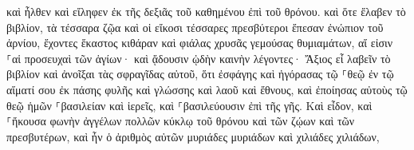 \documentclass{openreader}
\begin{document}
καὶ ἦλθεν καὶ εἴληφεν ἐκ τῆς δεξιᾶς τοῦ καθημένου ἐπὶ τοῦ θρόνου. 
καὶ ὅτε ἔλαβεν τὸ βιβλίον, τὰ τέσσαρα ζῷα καὶ οἱ εἴκοσι τέσσαρες πρεσβύτεροι ἔπεσαν ἐνώπιον τοῦ ἀρνίου, ἔχοντες ἕκαστος κιθάραν καὶ φιάλας χρυσᾶς γεμούσας θυμιαμάτων, αἵ εἰσιν ⸀αἱ προσευχαὶ τῶν ἁγίων· 
καὶ ᾄδουσιν ᾠδὴν καινὴν λέγοντες· Ἄξιος εἶ λαβεῖν τὸ βιβλίον καὶ ἀνοῖξαι τὰς σφραγῖδας αὐτοῦ, ὅτι ἐσφάγης καὶ ἠγόρασας τῷ ⸀θεῷ ἐν τῷ αἵματί σου ἐκ πάσης φυλῆς καὶ γλώσσης καὶ λαοῦ καὶ ἔθνους, 
καὶ ἐποίησας αὐτοὺς τῷ θεῷ ἡμῶν ⸀βασιλείαν καὶ ἱερεῖς, καὶ ⸀βασιλεύουσιν ἐπὶ τῆς γῆς. 
Καὶ εἶδον, καὶ ⸀ἤκουσα φωνὴν ἀγγέλων πολλῶν κύκλῳ τοῦ θρόνου καὶ τῶν ζῴων καὶ τῶν πρεσβυτέρων, καὶ ἦν ὁ ἀριθμὸς αὐτῶν μυριάδες μυριάδων καὶ χιλιάδες χιλιάδων, 
\end{document}

